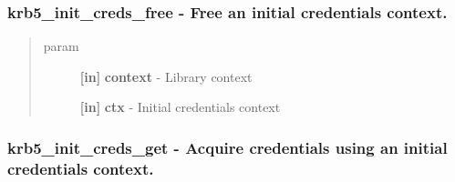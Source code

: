 \documentclass[letterpaper,10pt,english]{sphinxmanual}
\begin{document}
\subsubsection{krb5\_init\_creds\_free -  Free an initial credentials context.}
\label{appdev/refs/api/krb5_init_creds_free::doc}\label{appdev/refs/api/krb5_init_creds_free:krb5-init-creds-free-free-an-initial-credentials-context}

\begin{fulllineitems}
\label{appdev/refs/api/krb5_init_creds_free:c.krb5_init_creds_free}
\end{fulllineitems}

\begin{quote}\begin{description}
\item[{param}] \leavevmode
\textbf{{[}in{]}} \textbf{context} - Library context

\textbf{{[}in{]}} \textbf{ctx} - Initial credentials context

\end{description}\end{quote}


\subsubsection{krb5\_init\_creds\_get -  Acquire credentials using an initial credentials context.}
\label{appdev/refs/api/krb5_init_creds_get::doc}\label{appdev/refs/api/krb5_init_creds_get:krb5-init-creds-get-acquire-credentials-using-an-initial-credentials-context}

\begin{fulllineitems}
\label{appdev/refs/api/krb5_init_creds_get:c.krb5_init_creds_get}
\end{fulllineitems}
\end{document}
